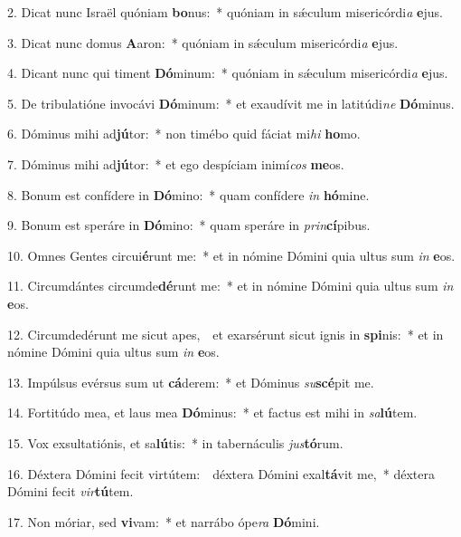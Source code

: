 
2. Dicat nunc Israël quóniam \textbf{bo}nus:~* quóniam in s\'{\ae}culum misericórdi\textit{a} \textbf{e}jus.

3. Dicat nunc domus \textbf{A}aron:~* quóniam in s\'{\ae}culum misericórdi\textit{a} \textbf{e}jus.

4. Dicant nunc qui timent \textbf{Dó}minum:~* quóniam in s\'{\ae}culum misericórdi\textit{a} \textbf{e}jus.

5. De tribulatióne invocávi \textbf{Dó}minum:~* et exaudívit me in latitúdi\textit{ne} \textbf{Dó}minus.

6. Dóminus mihi ad\textbf{jú}tor:~* non timébo quid fáciat mi\textit{hi} \textbf{ho}mo.

7. Dóminus mihi ad\textbf{jú}tor:~* et ego despíciam inimí\textit{cos} \textbf{me}os.

8. Bonum est confídere in \textbf{Dó}mino:~* quam confídere \textit{in} \textbf{hó}mine.

9. Bonum est speráre in \textbf{Dó}mino:~* quam speráre in \textit{prin}\textbf{cí}pibus.

10. Omnes Gentes circui\textbf{é}runt me:~* et in nómine Dómini quia ultus sum \textit{in} \textbf{e}os.

11. Circumdántes circumde\textbf{dé}runt me:~* et in nómine Dómini quia ultus sum \textit{in} \textbf{e}os.

12. Circumdedérunt me sicut apes,~\GreDagger\ et exarsérunt sicut ignis in \textbf{spi}nis:~* et in nómine Dómini quia ultus sum \textit{in} \textbf{e}os.

13. Impúlsus evérsus sum ut \textbf{cá}derem:~* et Dóminus \textit{su}\textbf{scé}pit me.

14. Fortitúdo mea, et laus mea \textbf{Dó}minus:~* et factus est mihi in \textit{sa}\textbf{lú}tem.

15. Vox exsultatiónis, et sa\textbf{lú}tis:~* in tabernáculis \textit{jus}\textbf{tó}rum.

16. Déxtera Dómini fecit virtútem:~\GreDagger\ déxtera Dómini exal\textbf{tá}vit me,~* déxtera Dómini fecit \textit{vir}\textbf{tú}tem.

17. Non móriar, sed \textbf{vi}vam:~* et narrábo ópe\textit{ra} \textbf{Dó}mini.

